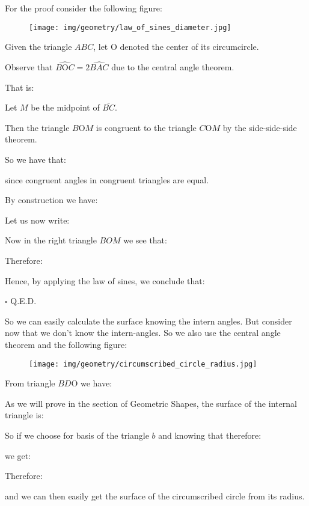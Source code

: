 	\begin{theorem}
	
	\end{theorem}
	\begin{dem}
	For the proof consider the following figure:
	\begin{figure}[H]
		\centering
		\texttt{[image: img/geometry/law\_of\_sines\_diameter.jpg]}
	\end{figure}
	Given the triangle $ABC$, let O denoted the center of its circumcircle. 

	Observe that $\widehat{B\text{O}C}=2\widehat{BAC}$ due to the central angle theorem.

	That is:
	
	Let $M$ be the midpoint of $\overline{BC}$.

	Then the triangle $B\text{O}M$ is congruent to the triangle $C\text{O}M$ by the side-side-side theorem.
	
	So we have that:
	
	since congruent angles in congruent triangles are equal.
	
	By construction we have:
	
	Let us now write:
	
	Now in the right triangle $BOM$ we see that:
	
	Therefore:
	
	Hence, by applying the law of sines, we conclude that:
	
	\begin{flushright}
		$\square$  Q.E.D.
	\end{flushright}
	\end{dem}
	So we can easily calculate the surface knowing the intern angles. But consider now that we don't know the intern-angles. So we also use the central angle theorem and the following figure:
	\begin{figure}[H]
		\centering
		\texttt{[image: img/geometry/circumscribed\_circle\_radius.jpg]}
	\end{figure}
	From triangle $BD\text{O}$ we have:
	
	As we will prove in the section of Geometric Shapes, the surface of the internal triangle is:
	
	So if we choose for basis of the triangle $b$ and knowing that therefore:
	
	we get:
	
	Therefore:
	
	and we can then easily get the surface of the circumscribed circle from its radius.
	
